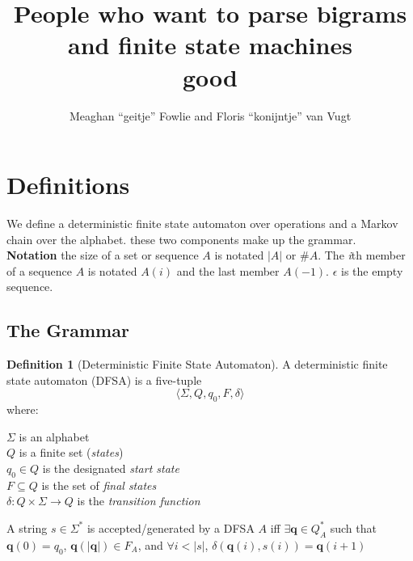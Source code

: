 \documentclass[12pt]{article}
\title{People who want to parse bigrams and finite state machines\\good}
\author{Meaghan ``geitje'' Fowlie and Floris ``konijntje'' van Vugt}
\theoremstyle{definition}
\newtheorem{definition}{Definition}[section]
\begin{document}
\maketitle

\section{Definitions}

\newcommand\STATES{\ensuremath{\mathbb{S}}}
\newcommand\OPS{\ensuremath{\mathbb{O}}}
\newcommand\BIGR{\ensuremath{\mathbb{B}}}
\newcommand\FSA{\textsc{FSA}}
\newcommand\PARSES{\ensuremath{\mathbb{P}}}
\newcommand\SC{\text{\textsc{sc}}}
\newcommand\TC{\text{\textsc{tc}}}
\newcommand\UC{\text{\textsc{uc}}}
\newcommand\BC{\text{\textsc{bc}}}
\newcommand\N{\ensuremath{\mathbb{N}}}
\newcommand\sg{\ensuremath{\Sigma}}
\newcommand\la{\ensuremath{\langle}}
\newcommand\ra{\ensuremath{\rangle}}
\newcommand\arr{\ensuremath{\rightarrow}}
\newcommand\emp{\ensuremath{\epsilon}}
\newcommand\op{\text{\textsl{op}}}
\newcommand\mg{\text{\textsl{mg}}}
\newcommand\cp{\text{\textsl{copy}}}
\newcommand\cl{\text{\textsl{clear}}}
\newcommand\ed{\text{\textsl{end}}}
\newcommand\expr{\text{\textsl{expr}}}
\newcommand\Lex{\text{\textsl{Lex}}}
\newcommand\fea[1]{\text{\texttt{#1}}}


\newcommand\der{\leftarrow}


We define a deterministic finite state automaton over operations and a Markov chain over the alphabet. these two components make up the grammar. \\

\noindent\textbf{Notation} the size of a set or sequence $A$ is notated $|A|$ or $\#A$. The \textit{i}th member of a sequence $A$ is notated $A(i)$ and the last member $A(-1)$. $\epsilon$ is the empty sequence.


\subsection{The Grammar}
\label{sec:grammar}



\begin{definition}[Deterministic Finite State Automaton]
  A deterministic finite state automaton (DFSA) is a five-tuple 
\[\la \sg, Q, q_0, F, \delta  \ra  \]
where:

\noindent $\sg$ is an alphabet\\
$Q$ is a finite set (\textit{states})\\
$q_0\in Q$ is the designated \textit{start state}\\
$F\subseteq Q$ is the set of \textit{final states}\\
$\delta: Q\times \sg \arr Q$ is the \textit{transition function} 

A string $s\in\sg^*$ is accepted/generated by a DFSA $A$ iff
$\exists \mathbf{q} \in Q_A^*$ such that $\mathbf{q}(0)=q_0$, $\mathbf{q}(|\mathbf{q}|)\in F_A$, and $\forall i<|s|$, $\delta(\mathbf{q}(i),s(i))=\mathbf{q}(i+1)$
\label{def:dfsa}
\end{definition}
\end{document}
